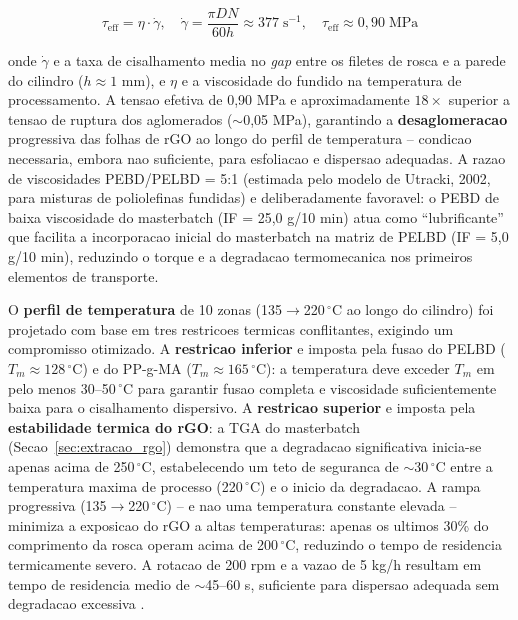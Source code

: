 \documentclass[11pt,a4paper,oneside]{article}
\begin{document}
\begin{equation}
\tau_{\text{eff}} = \eta \cdot \dot{\gamma},\quad \dot{\gamma} = \frac{\pi D N}{60 h} \approx 377\;\text{s}^{-1},\quad \tau_{\text{eff}} \approx 0{,}90\;\text{MPa}
\end{equation}

onde $\dot{\gamma}$ e a taxa de cisalhamento media no \textit{gap} entre os filetes de rosca e
a parede do cilindro ($h{\approx}1$ mm), e $\eta$ e a viscosidade do fundido na temperatura de
processamento. A tensao efetiva de 0,90 MPa e aproximadamente $18{\times}$ superior a tensao de
ruptura dos aglomerados (${\sim}$0,05 MPa), garantindo a {\bfseries desaglomeracao} progressiva
das folhas de rGO ao longo do perfil de temperatura -- condicao necessaria, embora nao
suficiente, para esfoliacao e dispersao adequadas. A razao de viscosidades PEBD/PELBD = 5:1
(estimada pelo modelo de Utracki, 2002, para misturas de poliolefinas fundidas) e
deliberadamente favoravel: o PEBD de baixa viscosidade do masterbatch (IF = 25,0 g/10 min)
atua como ``lubrificante'' que facilita a incorporacao inicial do masterbatch na matriz de
PELBD (IF = 5,0 g/10 min), reduzindo o torque e a degradacao termomecanica nos primeiros
elementos de transporte.

O {\bfseries perfil de temperatura} de 10 zonas (135$\rightarrow$220$\,^{\circ}$C ao longo do
cilindro) foi projetado com base em tres restricoes termicas conflitantes, exigindo um
compromisso otimizado. A {\bfseries restricao inferior} e imposta pela fusao do PELBD
($T_m{\approx}128\,^{\circ}$C) e do PP-g-MA ($T_m{\approx}165\,^{\circ}$C): a temperatura deve
exceder $T_m$ em pelo menos 30--50$\,^{\circ}$C para garantir fusao completa e viscosidade
suficientemente baixa para o cisalhamento dispersivo. A {\bfseries restricao superior} e imposta
pela {\bfseries estabilidade termica do rGO}: a TGA do masterbatch (Secao~\ref{sec:extracao_rgo})
demonstra que a degradacao significativa inicia-se apenas acima de 250$\,^{\circ}$C, estabelecendo
um teto de seguranca de ${\sim}$30$\,^{\circ}$C entre a temperatura maxima de processo
(220$\,^{\circ}$C) e o inicio da degradacao. A rampa progressiva (135$\rightarrow$220$\,^{\circ}$C)
-- e nao uma temperatura constante elevada -- minimiza a exposicao do rGO a altas temperaturas:
apenas os ultimos 30\% do comprimento da rosca operam acima de 200$\,^{\circ}$C, reduzindo o
tempo de residencia termicamente severo. A rotacao de 200 rpm e a vazao de 5 kg/h resultam em
tempo de residencia medio de ${\sim}$45--60 s, suficiente para dispersao adequada sem degradacao
excessiva \cite{Sanes2020}.
\end{document}
